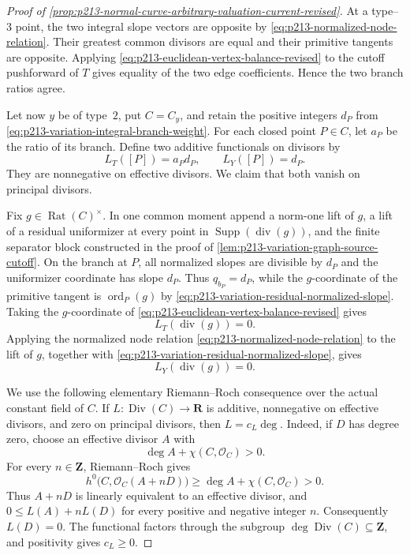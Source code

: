 \begin{proof}[Proof of
\cref{prop:p213-normal-curve-arbitrary-valuation-current-revised}]
At a type--$3$ point, the two integral slope vectors are opposite by
\eqref{eq:p213-normalized-node-relation}.  Their greatest common divisors
are equal and their primitive tangents are opposite.  Applying
\eqref{eq:p213-euclidean-vertex-balance-revised} to the cutoff pushforward
of $T$ gives equality of the two edge coefficients.  Hence the two branch
ratios agree.

Let now $y$ be of type~$2$, put $C=C_y$, and retain the positive integers
$d_P$ from \eqref{eq:p213-variation-integral-branch-weight}.  For each
closed point $P\in C$, let $a_P$ be the ratio of its branch.  Define two
additive functionals on divisors by
\begin{equation}
       L_T([P])=a_Pd_P,
       \qquad
       L_Y([P])=d_P.
\label{eq:p213-divisor-functionals-revised}
\end{equation}
They are nonnegative on effective divisors.  We claim that both vanish on
principal divisors.

Fix $g\in\operatorname{Rat}(C)^\times$.  In one common moment append a
norm-one lift of $g$, a lift of a residual uniformizer at every point in
$\operatorname{Supp}(\operatorname{div}(g))$, and the finite separator
block constructed in the proof of
\cref{lem:p213-variation-graph-source-cutoff}.  On the branch at $P$, all
normalized slopes are divisible by $d_P$ and the uniformizer coordinate
has slope $d_P$.  Thus $q_{b_P}=d_P$, while the $g$-coordinate of the
primitive tangent is $\operatorname{ord}_P(g)$ by
\eqref{eq:p213-variation-residual-normalized-slope}.  Taking the
$g$-coordinate of
\eqref{eq:p213-euclidean-vertex-balance-revised} gives
\begin{equation}
                         L_T(\operatorname{div}(g))=0.
\label{eq:p213-T-principal-zero-revised}
\end{equation}
Applying the normalized node relation
\eqref{eq:p213-normalized-node-relation} to the lift of $g$, together with
\eqref{eq:p213-variation-residual-normalized-slope}, gives
\begin{equation}
                         L_Y(\operatorname{div}(g))=0.
\label{eq:p213-Y-principal-zero-revised}
\end{equation}

We use the following elementary Riemann--Roch consequence over the actual
constant field of $C$.  If
$L:\operatorname{Div}(C)\to\mathbf R$ is additive, nonnegative on
effective divisors, and zero on principal divisors, then $L=c_L\deg$.
Indeed, if $D$ has degree zero, choose an effective divisor $A$ with
\begin{equation}
                  \deg A+\chi(C,\mathcal O_C)>0.
\label{eq:p213-rr-positive-constant-revised}
\end{equation}
For every $n\in\mathbf Z$, Riemann--Roch gives
\[
 h^0\bigl(C,\mathcal O_C(A+nD)\bigr)
    \geq \deg A+\chi(C,\mathcal O_C)>0.
\]
Thus $A+nD$ is linearly equivalent to an effective divisor, and
$0\leq L(A)+nL(D)$ for every positive and negative integer $n$.
Consequently $L(D)=0$.  The functional factors through the subgroup
$\deg\operatorname{Div}(C)\subseteq\mathbf Z$, and positivity gives
$c_L\geq0$.


\end{proof}
